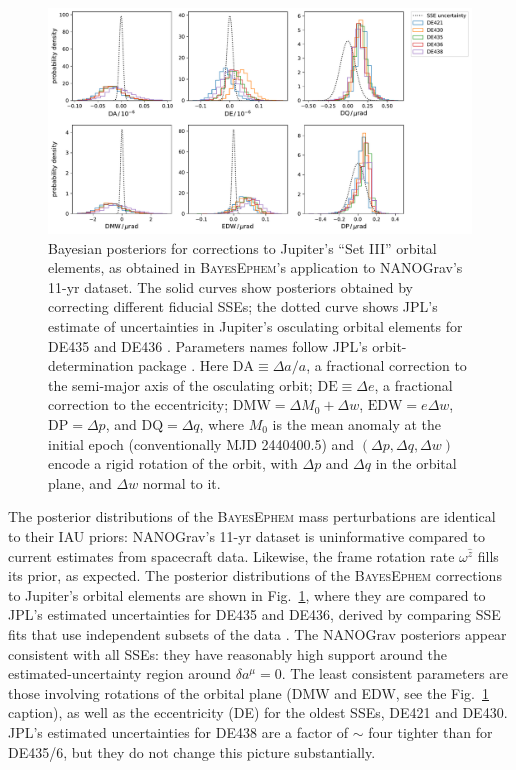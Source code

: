 \documentclass{aastex63}
\begin{document}
\begin{figure}[t]
    \includegraphics[width=\columnwidth]{setIII-posteriors.pdf}
    \caption{Bayesian posteriors for corrections to Jupiter's ``Set III'' orbital elements, as obtained in \textsc{BayesEphem}'s application to NANOGrav's 11-yr dataset. The solid curves show posteriors obtained by correcting different fiducial SSEs; the dotted curve shows JPL's estimate of uncertainties in Jupiter's osculating orbital elements for DE435 and DE436 \citep{de434}.
    Parameters names follow JPL's orbit-determination package \citep{moyer2003}. %
    Here $\mathrm{DA} \equiv \Delta a/a$, a fractional correction to the semi-major axis of the osculating orbit; $\mathrm{DE} \equiv \Delta e$, a fractional correction to the eccentricity; $\mathrm{DMW} = \Delta M_0 + \Delta w$, $\mathrm{EDW} = e \Delta w$, $\mathrm{DP} = \Delta p$, and $\mathrm{DQ} = \Delta q$, where $M_0$ is the mean anomaly at the initial epoch (conventionally MJD 2440400.5) and $(\Delta p, \Delta q, \Delta w)$ encode a rigid rotation of the orbit, with $\Delta p$ and $\Delta q$ in the orbital plane, and $\Delta w$ normal to it.}
    \label{fig:setIIIposteriors}
\end{figure}

The posterior distributions of the \textsc{BayesEphem} mass perturbations are identical to their IAU priors:  NANOGrav's 11-yr dataset is uninformative compared to current estimates from spacecraft data. Likewise, the frame rotation rate $\omega^{\hat{z}}$ fills its prior, as expected.
The posterior distributions of the \textsc{BayesEphem} corrections to Jupiter's orbital elements are shown in Fig.\ \ref{fig:setIIIposteriors}, where they are compared to JPL's estimated uncertainties for DE435 and DE436, derived by comparing SSE fits that use independent subsets of the data \citep{de434}. The NANOGrav posteriors appear consistent with all SSEs: they have reasonably high support around the estimated-uncertainty region around $\delta a^\mu = 0$. The least consistent parameters are those involving rotations of the orbital plane (DMW and EDW, see the Fig.\ \ref{fig:setIIIposteriors} caption), as well as the eccentricity (DE) for the oldest SSEs, DE421 and DE430. JPL's estimated uncertainties for DE438 are a factor of $\sim$ four tighter than for DE435/6, but they do not change this picture substantially.
\end{document}
